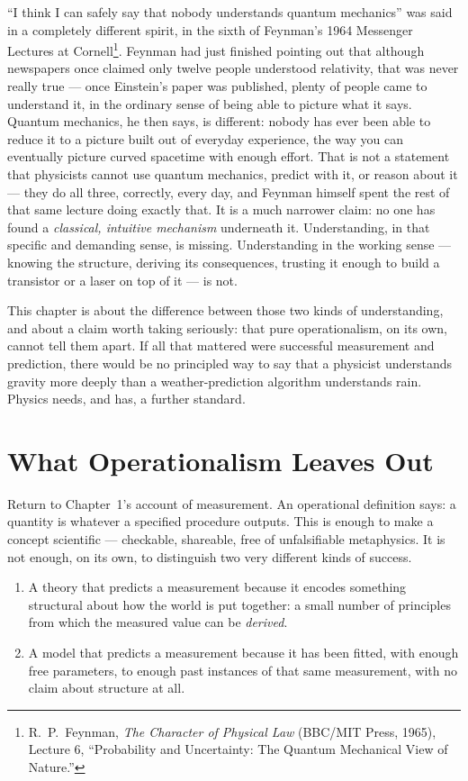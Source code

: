 \documentclass[12pt]{book}
\begin{document}
``I think I can safely say that nobody understands quantum mechanics'' was said in a completely different spirit, in the sixth of Feynman's 1964 Messenger Lectures at Cornell\footnote{R.~P.~Feynman, \emph{The Character of Physical Law} (BBC/MIT Press, 1965), Lecture 6, ``Probability and Uncertainty: The Quantum Mechanical View of Nature.''}. Feynman had just finished pointing out that although newspapers once claimed only twelve people understood relativity, that was never really true --- once Einstein's paper was published, plenty of people came to understand it, in the ordinary sense of being able to picture what it says. Quantum mechanics, he then says, is different: nobody has ever been able to reduce it to a picture built out of everyday experience, the way you can eventually picture curved spacetime with enough effort. That is not a statement that physicists cannot use quantum mechanics, predict with it, or reason about it --- they do all three, correctly, every day, and Feynman himself spent the rest of that same lecture doing exactly that. It is a much narrower claim: no one has found a \emph{classical, intuitive mechanism} underneath it. Understanding, in that specific and demanding sense, is missing. Understanding in the working sense --- knowing the structure, deriving its consequences, trusting it enough to build a transistor or a laser on top of it --- is not.

This chapter is about the difference between those two kinds of understanding, and about a claim worth taking seriously: that pure operationalism, on its own, cannot tell them apart. If all that mattered were successful measurement and prediction, there would be no principled way to say that a physicist understands gravity more deeply than a weather-prediction algorithm understands rain. Physics needs, and has, a further standard.

\section{What Operationalism Leaves Out}
\label{sec:blind-spot}

Return to Chapter~1's account of measurement. An operational definition says: a quantity is whatever a specified procedure outputs. This is enough to make a concept scientific --- checkable, shareable, free of unfalsifiable metaphysics. It is not enough, on its own, to distinguish two very different kinds of success.

\begin{enumerate}
\item A theory that predicts a measurement because it encodes something structural about how the world is put together: a small number of principles from which the measured value can be \emph{derived}.
\item A model that predicts a measurement because it has been fitted, with enough free parameters, to enough past instances of that same measurement, with no claim about structure at all.
\end{enumerate}
\end{document}
